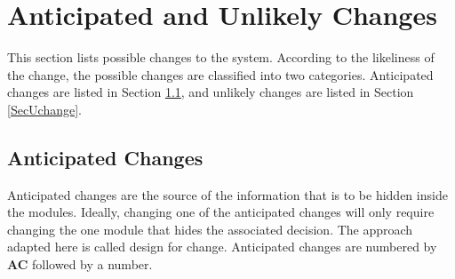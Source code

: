 \documentclass[12pt]{article}
\begin{document}
\section{Anticipated and Unlikely Changes} \label{SecChange}

\hspace{3ex}This section lists possible changes to the
system. According to the likeliness of the change, the possible
changes are classified into two categories. Anticipated changes are
listed in Section \ref{SecAchange}, and unlikely changes are listed in
Section \ref{SecUchange}.

\subsection{Anticipated Changes} \label{SecAchange}

\hspace{3ex}Anticipated changes are the source of the information that
is to be hidden inside the modules. Ideally, changing one of the
anticipated changes will only require changing the one module that
hides the associated decision. The approach adapted here is called
design for change. Anticipated changes are numbered by \textbf{AC}
followed by a number.
\end{document}
